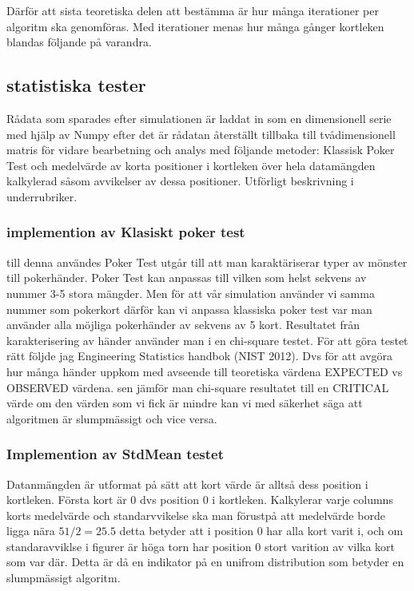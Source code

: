 \documentclass[swedish,a4paper]{article}
\begin{document}
Därför att sista teoretiska delen att bestämma
är hur många iterationer per algoritm ska genomföras. Med iterationer menas
hur många gånger kortleken blandas följande på varandra.

\subsection{statistiska tester}
Rådata som sparades efter simulationen är laddat in som en dimensionell serie
med hjälp av Numpy  efter det är rådatan återställt tillbaka till
tvådimensionell matris för vidare bearbetning och analys med följande metoder:
Klassisk Poker Test och medelvärde av korta positioner i kortleken över hela
datamängden kalkylerad såsom avvikelser av dessa positioner. Utförligt
beskrivning i underrubriker. 

\subsubsection{implemention av Klasiskt poker test}
till denna användes \textcite{scipy}
Poker Test utgår till att man karaktäriserar typer av mönster till pokerhänder.
Poker Test kan anpassas till vilken som helst sekvens av nummer 3-5 stora
mängder. Men för att vår simulation använder vi samma nummer som pokerkort
därför kan vi anpassa klassiska poker test var man använder alla möjliga
pokerhänder av sekvens av 5 kort. Resultatet från karakterisering av händer
använder man i en chi-square testet. För att göra testet rätt följde jag
Engineering Statistics handbok (NIST 2012). Dvs för att avgöra hur många händer
uppkom med avseende till teoretiska värdena EXPECTED vs OBSERVED värdena. sen
jämför man chi-square resultatet till en CRITICAL värde om den värden som vi
fick är mindre kan vi med säkerhet säga att algoritmen är slumpmässigt och vice
versa.

\subsubsection{Implemention av StdMean testet}
Datanmängden är utformat på sätt att kort värde är alltså dess position i
kortleken. Första kort är 0 dvs position 0 i kortleken. Kalkylerar varje
columns korts medelvärde och standarvvikelse ska man förustpå att medelvärde
borde ligga nära $51/2= 25.5$ detta betyder att i position 0 har alla kort varit
i, och om standaravviklse i figurer är höga torn har position 0 stort varition
av vilka kort som var där. Detta är då en indikator på en unifrom distribution
som betyder en slumpmässigt algoritm.
\end{document}
